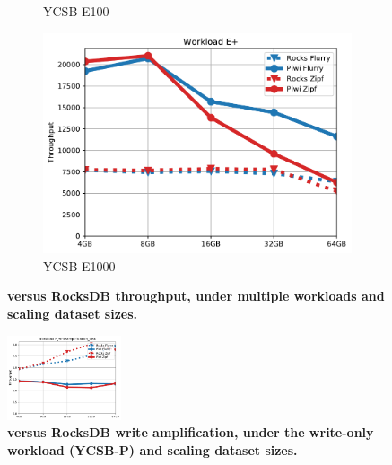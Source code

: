 \begin{figure}[tb]
\begin{subfigure}{0.3\linewidth}
\caption{YCSB-E100}
\label{fig:throughput:e100}
\end{subfigure}
\begin{subfigure}{0.3\linewidth}
\includegraphics[width=\textwidth]{figs/Workload_E+_line.pdf}
\caption{YCSB-E1000}
\label{fig:throughput:e1000}
\end{subfigure}
\caption{\bf{\sys\/ versus RocksDB throughput, under multiple workloads and scaling dataset sizes.}}
\label{fig:throughput}
\end{figure}

\begin{figure}[th]
\centering
\includegraphics[width=0.3\textwidth]{figs/Workload_P_writeamplification_disk_line.pdf}
\caption{\bf{\sys\/ versus RocksDB write amplification, under the write-only workload (YCSB-P) and scaling dataset sizes.}}
\label{fig:writeamp}
\end{figure}

